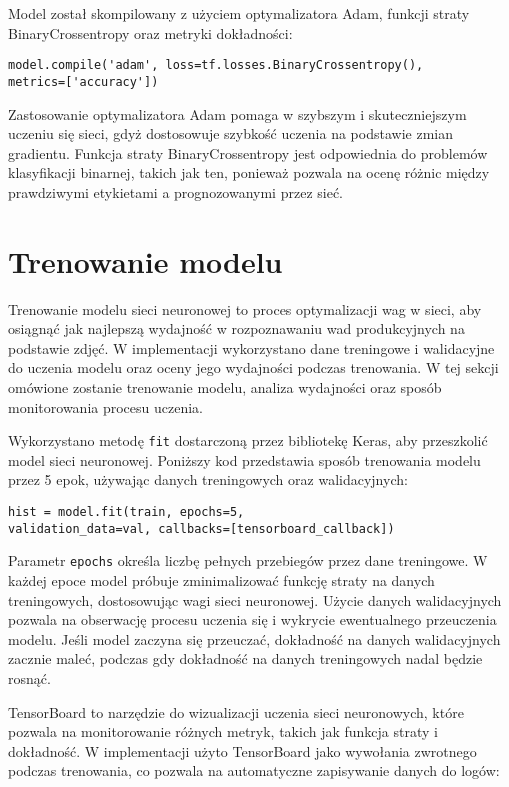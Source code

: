 Model został skompilowany z użyciem optymalizatora Adam, funkcji straty BinaryCrossentropy oraz metryki dokładności:

\begin{verbatim}
model.compile('adam', loss=tf.losses.BinaryCrossentropy(),
metrics=['accuracy'])
\end{verbatim}

Zastosowanie optymalizatora Adam pomaga w szybszym i skuteczniejszym uczeniu się sieci, gdyż dostosowuje szybkość uczenia na podstawie zmian gradientu. Funkcja straty BinaryCrossentropy jest odpowiednia do problemów klasyfikacji binarnej, takich jak ten, ponieważ pozwala na ocenę różnic między prawdziwymi etykietami a prognozowanymi przez sieć.

\section{Trenowanie modelu}

Trenowanie modelu sieci neuronowej to proces optymalizacji wag w sieci, aby osiągnąć jak najlepszą wydajność w rozpoznawaniu wad produkcyjnych na podstawie zdjęć. W implementacji wykorzystano dane treningowe i walidacyjne do uczenia modelu oraz oceny jego wydajności podczas trenowania. W tej sekcji omówione zostanie trenowanie modelu, analiza wydajności oraz sposób monitorowania procesu uczenia.

Wykorzystano metodę \verb|fit| dostarczoną przez bibliotekę Keras, aby przeszkolić model sieci neuronowej. Poniższy kod przedstawia sposób trenowania modelu przez 5 epok, używając danych treningowych oraz walidacyjnych:

\begin{verbatim}
hist = model.fit(train, epochs=5, 
validation_data=val, callbacks=[tensorboard_callback])
\end{verbatim}

Parametr \verb|epochs| określa liczbę pełnych przebiegów przez dane treningowe. W każdej epoce model próbuje zminimalizować funkcję straty na danych treningowych, dostosowując wagi sieci neuronowej. Użycie danych walidacyjnych pozwala na obserwację procesu uczenia się i wykrycie ewentualnego przeuczenia modelu. Jeśli model zaczyna się przeuczać, dokładność na danych walidacyjnych zacznie maleć, podczas gdy dokładność na danych treningowych nadal będzie rosnąć.

TensorBoard to narzędzie do wizualizacji uczenia sieci neuronowych, które pozwala na monitorowanie różnych metryk, takich jak funkcja straty i dokładność. W implementacji użyto TensorBoard jako wywołania zwrotnego podczas trenowania, co pozwala na automatyczne zapisywanie danych do logów:

